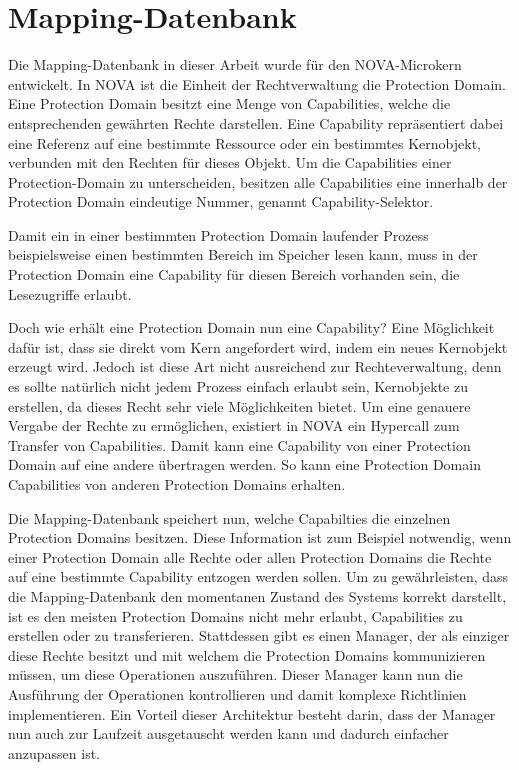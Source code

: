 \documentclass[a4paper, parskip]{scrartcl}
\begin{document}
\section{Mapping-Datenbank}

Die Mapping-Datenbank in dieser Arbeit wurde für den NOVA-Microkern\autocite{nova2010} entwickelt.
In NOVA ist die Einheit der Rechtverwaltung die Protection Domain. 
Eine Protection Domain besitzt eine Menge von Capabilities, welche die entsprechenden gewährten Rechte darstellen.
Eine Capability repräsentiert dabei eine Referenz auf eine bestimmte Ressource oder ein bestimmtes Kernobjekt, verbunden mit den Rechten für dieses Objekt.
Um die Capabilities einer Protection-Domain zu unterscheiden, besitzen alle Capabilities eine innerhalb der Protection Domain eindeutige Nummer, genannt Capability-Selektor.

Damit ein in einer bestimmten Protection Domain laufender Prozess beispielsweise einen bestimmten Bereich im Speicher lesen kann, muss in der Protection Domain eine Capability für diesen Bereich vorhanden sein, die Lesezugriffe erlaubt.

Doch wie erhält eine Protection Domain nun eine Capability? 
Eine Möglichkeit dafür ist, dass sie direkt vom Kern angefordert wird, indem ein neues Kernobjekt erzeugt wird.
Jedoch ist diese Art nicht ausreichend zur Rechteverwaltung, denn es sollte natürlich nicht jedem Prozess einfach erlaubt sein, Kernobjekte zu erstellen, da dieses Recht sehr viele Möglichkeiten bietet.
Um eine genauere Vergabe der Rechte zu ermöglichen, existiert in NOVA ein Hypercall zum Transfer von Capabilities.
Damit kann eine Capability von einer Protection Domain auf eine andere übertragen werden.
So kann eine Protection Domain Capabilities von anderen Protection Domains erhalten.

Die Mapping-Datenbank speichert nun, welche Capabilties die einzelnen Protection Domains besitzen.
Diese Information ist zum Beispiel notwendig, wenn einer Protection Domain alle Rechte oder allen Protection Domains die Rechte auf eine bestimmte Capability entzogen werden sollen.
Um zu gewährleisten, dass die Mapping-Datenbank den momentanen Zustand des Systems korrekt darstellt, ist es den meisten Protection Domains nicht mehr erlaubt, Capabilities zu erstellen oder zu transferieren.
Stattdessen gibt es einen Manager, der als einziger diese Rechte besitzt und mit welchem die Protection Domains kommunizieren müssen, um diese Operationen auszuführen.
Dieser Manager kann nun die Ausführung der Operationen kontrollieren und damit komplexe Richtlinien implementieren.
Ein Vorteil dieser Architektur besteht darin, dass der Manager nun auch zur Laufzeit ausgetauscht werden kann und dadurch einfacher anzupassen ist.
\end{document}
